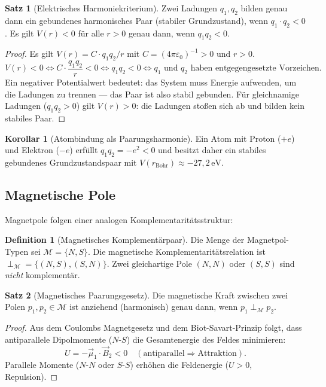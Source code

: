 ﻿\documentclass[a4paper,12pt]{article}
\theoremstyle{definition}
\newtheorem{definition}{Definition}
\newtheorem{satz}{Satz}
\newtheorem{korollar}{Korollar}
\begin{document}
\begin{satz}[Elektrisches Harmoniekriterium]
	\label{satz:coulomb}
	Zwei Ladungen $q_1, q_2$ bilden genau dann ein gebundenes harmonisches Paar
	(stabiler Grundzustand), wenn $q_1 \cdot q_2 < 0$.
	Es gilt $V(r) < 0$ für alle $r > 0$ genau dann, wenn $q_1 q_2 < 0$.
\end{satz}

\begin{proof}
	Es gilt $V(r) = C \cdot q_1 q_2 / r$ mit $C = (4\pi\varepsilon_0)^{-1} > 0$ und $r > 0$.
	\[
		V(r) < 0
		\iff C \cdot \frac{q_1 q_2}{r} < 0
		\iff q_1 q_2 < 0
		\iff q_1 \text{ und } q_2 \text{ haben entgegengesetzte Vorzeichen.}
	\]
	Ein negativer Potentialwert bedeutet: das System muss Energie aufwenden, um die
	Ladungen zu trennen --- das Paar ist also stabil gebunden.
	Für gleichnamige Ladungen ($q_1 q_2 > 0$) gilt $V(r) > 0$: die Ladungen stoßen
	sich ab und bilden kein stabiles Paar.
\end{proof}

\begin{korollar}[Atombindung als Paarungsharmonie]
	Ein Atom mit Proton ($+e$) und Elektron ($-e$) erfüllt $q_1 q_2 = -e^2 < 0$ und
	besitzt daher ein stabiles gebundenes Grundzustandspaar mit
	$V(r_{\mathrm{Bohr}}) \approx -27{,}2\,\mathrm{eV}$.
\end{korollar}

\subsection{Magnetische Pole}

Magnetpole folgen einer analogen Komplementaritätsstruktur:

\begin{definition}[Magnetisches Komplementärpaar]
	Die Menge der Magnetpol-Typen sei $\mathcal{M} = \{N, S\}$.
	Die magnetische Komplementaritätsrelation ist
	$\perp_{\mathcal{M}} = \{(N, S), (S, N)\}$.
	Zwei gleichartige Pole $(N,N)$ oder $(S,S)$ sind \emph{nicht} komplementär.
\end{definition}

\begin{satz}[Magnetisches Paarungsgesetz]
	\label{satz:magnet}
	Die magnetische Kraft zwischen zwei Polen $p_1, p_2 \in \mathcal{M}$ ist anziehend
	(harmonisch) genau dann, wenn $p_1 \perp_{\mathcal{M}} p_2$.
\end{satz}

\begin{proof}
	Aus dem Coulombs Magnetgesetz und dem Biot-Savart-Prinzip folgt, dass
	antiparallele Dipolmomente ($N$-$S$) die Gesamtenergie des Feldes minimieren:
	\[
		U = -\vec{\mu}_1 \cdot \vec{B}_2 < 0 \quad (\text{antiparallel} \Rightarrow \text{Attraktion}).
	\]
	Parallele Momente ($N$-$N$ oder $S$-$S$) erhöhen die Feldenergie ($U > 0$,
	Repulsion). \qedhere
\end{proof}
\end{document}
